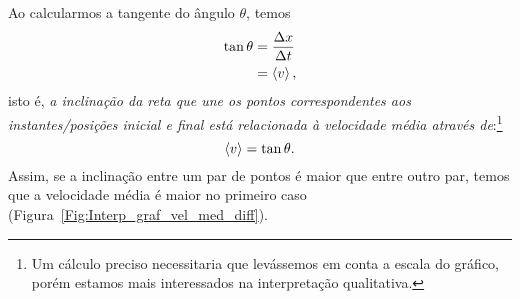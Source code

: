 \noindent{}Ao calcularmos a tangente do ângulo $\theta$, temos
\begin{align}
    \tan\theta &= \frac{\Delta x}{\Delta t} \\
    & = \left\langle{v}\right\rangle,
\end{align}
%
isto é, \emph{a inclinação da reta que une os pontos correspondentes aos instantes/posições inicial e final está relacionada à velocidade média através de}:\footnote[][-2cm]{Um cálculo preciso necessitaria que levássemos em conta a escala do gráfico, porém estamos mais interessados na interpretação qualitativa.}
\begin{equation}
    \left\langle{v}\right\rangle = \tan\theta.
\end{equation}
%
Assim, se a inclinação entre um par de pontos é maior que entre outro par, temos que a velocidade média é maior no primeiro caso (Figura~\ref{Fig:Interp_graf_vel_med_diff}).

